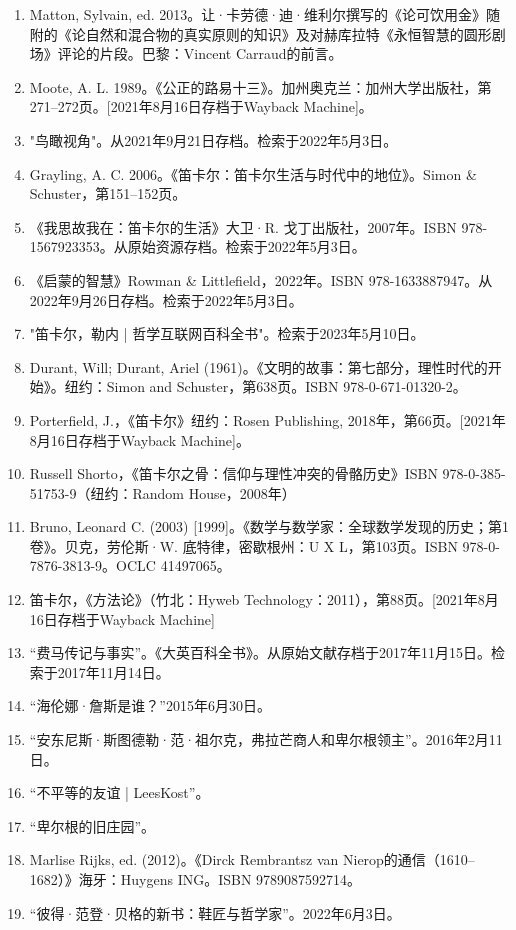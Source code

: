 \begin{enumerate}
\item Matton, Sylvain, ed. 2013。让·卡劳德·迪·维利尔撰写的《论可饮用金》随附的《论自然和混合物的真实原则的知识》及对赫库拉特《永恒智慧的圆形剧场》评论的片段。巴黎：Vincent Carraud的前言。
\item Moote, A. L. 1989。《公正的路易十三》。加州奥克兰：加州大学出版社，第271–272页。[2021年8月16日存档于Wayback Machine]。
\item "鸟瞰视角"。从2021年9月21日存档。检索于2022年5月3日。
\item Grayling, A. C. 2006。《笛卡尔：笛卡尔生活与时代中的地位》。Simon & Schuster，第151–152页。
\item 《我思故我在：笛卡尔的生活》大卫·R. 戈丁出版社，2007年。ISBN 978-1567923353。从原始资源存档。检索于2022年5月3日。
\item 《启蒙的智慧》Rowman & Littlefield，2022年。ISBN 978-1633887947。从2022年9月26日存档。检索于2022年5月3日。
\item "笛卡尔，勒内 | 哲学互联网百科全书"。检索于2023年5月10日。
\item Durant, Will; Durant, Ariel (1961)。《文明的故事：第七部分，理性时代的开始》。纽约：Simon and Schuster，第638页。ISBN 978-0-671-01320-2。
\item Porterfield, J.，《笛卡尔》纽约：Rosen Publishing, 2018年，第66页。[2021年8月16日存档于Wayback Machine]。
\item Russell Shorto，《笛卡尔之骨：信仰与理性冲突的骨骼历史》ISBN 978-0-385-51753-9（纽约：Random House，2008年）
\item Bruno, Leonard C. (2003) [1999]。《数学与数学家：全球数学发现的历史；第1卷》。贝克，劳伦斯·W. 底特律，密歇根州：U X L，第103页。ISBN 978-0-7876-3813-9。OCLC 41497065。
\item 笛卡尔，《方法论》（竹北：Hyweb Technology：2011），第88页。[2021年8月16日存档于Wayback Machine]
\item “费马传记与事实”。《大英百科全书》。从原始文献存档于2017年11月15日。检索于2017年11月14日。
\item “海伦娜·詹斯是谁？”2015年6月30日。
\item “安东尼斯·斯图德勒·范·祖尔克，弗拉芒商人和卑尔根领主”。2016年2月11日。
\item “不平等的友谊 | LeesKost”。
\item “卑尔根的旧庄园”。
\item Marlise Rijks, ed. (2012)。《Dirck Rembrantsz van Nierop的通信（1610–1682）》海牙：Huygens ING。ISBN 9789087592714。
\item “彼得·范登·贝格的新书：鞋匠与哲学家”。2022年6月3日。

\end{enumerate}
